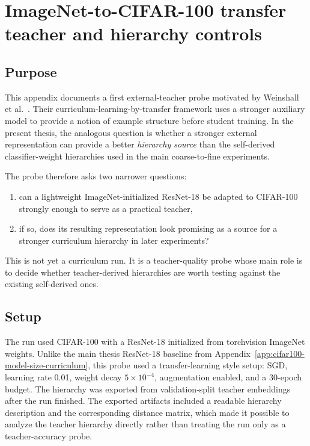 \chapter{ImageNet-to-CIFAR-100 transfer teacher and hierarchy controls}
\label{app:teacher-transfer-probe}

\section{Purpose}

This appendix documents a first external-teacher probe motivated by Weinshall
et al.\ \cite{weinshall2018curriculum}. Their curriculum-learning-by-transfer
framework uses a stronger auxiliary model to provide a notion of example
structure before student training. In the present thesis, the analogous
question is whether a stronger external representation can provide a better
\emph{hierarchy source} than the self-derived classifier-weight hierarchies used
in the main coarse-to-fine experiments.

The probe therefore asks two narrower questions:

\begin{enumerate}
    \item can a lightweight ImageNet-initialized ResNet-18 be adapted to
          CIFAR-100 strongly enough to serve as a practical teacher,
    \item if so, does its resulting representation look promising as a source
          for a stronger curriculum hierarchy in later experiments?
\end{enumerate}

This is not yet a curriculum run. It is a teacher-quality probe whose main role
is to decide whether teacher-derived hierarchies are worth testing against the
existing self-derived ones.

\section{Setup}

The run used CIFAR-100 \cite{krizhevsky2009learning} with a ResNet-18
\cite{he2016deep} initialized from torchvision ImageNet weights. Unlike the
main thesis ResNet-18 baseline from Appendix~\ref{app:cifar100-model-size-curriculum},
this probe used a transfer-learning style setup: SGD, learning rate 0.01,
weight decay $5\times 10^{-4}$, augmentation enabled, and a 30-epoch budget.
The hierarchy was exported from validation-split teacher embeddings after the
run finished. The exported artifacts included a readable hierarchy description
and the corresponding distance matrix, which made it possible to analyze the
teacher hierarchy directly rather than treating the run only as a
teacher-accuracy probe.

